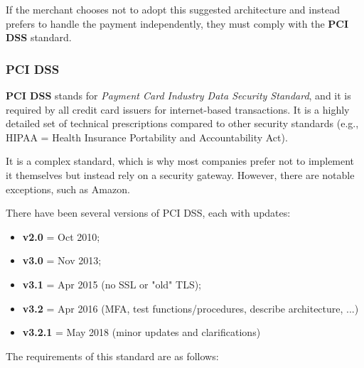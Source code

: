 If the merchant chooses not to adopt this suggested architecture and instead prefers to handle the payment independently, they must comply with the \textbf{PCI DSS} standard.


\subsubsection{PCI DSS}
\textbf{PCI DSS} stands for \textit{Payment Card Industry Data Security Standard}, and it is required by all credit card issuers for internet-based transactions. It is a highly detailed set of technical prescriptions compared to other security standards (e.g., HIPAA = Health Insurance Portability and Accountability Act).

It is a complex standard, which is why most companies prefer not to implement it themselves but instead rely on a security gateway. However, there are notable exceptions, such as Amazon.

There have been several versions of PCI DSS, each with updates:
\begin{itemize}
	\item \textbf{v2.0} = Oct 2010;
	\item \textbf{v3.0} = Nov 2013;
	\item \textbf{v3.1} = Apr 2015 (no SSL or "old" TLS);
	\item \textbf{v3.2} = Apr 2016 (MFA, test functions/procedures, describe architecture, ...)
	\item \textbf{v3.2.1} = May 2018 (minor updates and clarifications)
\end{itemize}

The requirements of this standard are as follows:

